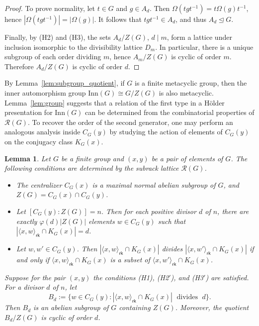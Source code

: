\documentclass[a4paper,12pt]{article}
\newtheorem{lem}[thm]{Lemma}
\theoremstyle{definition}
\theoremstyle{remark}
\begin{document}
\begin{proof}
  To prove normality, let $t\in G$ and $g\in A_d$. Then $\Omega(tgt^{-1}) = t\Omega(g)t^{-1}$, hence $|\Omega(tgt^{-1})|=|\Omega(g)|$. It follows that $tgt^{-1}\in A_d$, and thus $A_d\trianglelefteq G$.

  Finally, by (H2) and (H3), the sets $A_d/Z(G)$, $d\mid m$, form a lattice under inclusion isomorphic to the divisibility lattice $D_m$. In particular, there is a unique subgroup of each order dividing $m$, hence $A_m/Z(G)$ is cyclic of order $m$. Therefore $A_d/Z(G)$ is cyclic of order $d$.
\end{proof}


By Lemma~\ref{lem:subgroup_quotient}, if $G$ is a finite metacyclic group, then the inner automorphism group $\mathrm{Inn}(G)\cong G/Z(G)$ is also metacyclic. Lemma~\ref{lem:group} suggests that a relation of the first type in a Hölder presentation for $\mathrm{Inn}(G)$ can be determined from the combinatorial properties of $\mathcal R(G)$. To recover the order of the second generator, one may perform an analogous analysis inside $C_G(y)$ by studying the action of elements of $C_G(y)$ on the conjugacy class $K_G(x)$.

\begin{lem}\label{lem:group_y}
  Let $G$ be a finite group and $(x,y)$ be a pair of elements of $G$. The following conditions are determined by the subrack lattice $\mathcal{R}(G)$.
  \begin{itemize}
  \item[{\rm (H1)}] The centralizer $C_G(x)$ is a maximal normal abelian subgroup of $G$, and $Z(G)=C_G(x)\cap C_G(y)$.
  \item[{\rm (H2$'$)}] Let $[C_G(y):Z(G)]=n$. Then for each positive divisor $d$ of $n$, there are exactly $\varphi(d)|Z(G)|$ elements $w\in C_G(y)$ such that $|\langle x,w\rangle_{\mathsf{rk}}\cap K_G(x)|=d$.
  \item[{\rm (H3$'$)}] Let $w,w'\in C_G(y)$. Then $|\langle x,w\rangle_{\mathsf{rk}}\cap K_G(x)|$ divides $|\langle x,w'\rangle_{\mathsf{rk}}\cap K_G(x)|$ if and only if $\langle x,w\rangle_{\mathsf{rk}}\cap K_G(x)$ is a subset of $\langle x,w'\rangle_{\mathsf{rk}}\cap K_G(x)$.
  \end{itemize}
  Suppose for the pair $(x,y)$ the conditions {\rm (H1)}, {\rm (H2$'$)}, and {\rm (H3$'$)} are satisfied. For a divisor $d$ of $n$, let
  $$ B_d := \{w\in C_G(y)\colon |\langle x,w\rangle_{\mathsf{rk}}\cap K_G(x)|\; \text{ divides }\; d\}. $$
  Then $B_d$ is an abelian subgroup of $G$ containing $Z(G)$. Moreover, the quotient $B_d/Z(G)$ is cyclic of order $d$.     
\end{lem}
\end{document}
